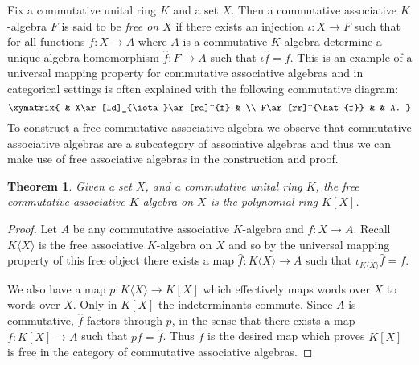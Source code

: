\documentclass[12pt]{article}
\newtheorem{thm}{Theorem}
\begin{document}
Fix a commutative unital ring $K$ and a set $X$. Then a commutative associative $K$-algebra $F$ is said to be \emph{free on $X$} if there exists an injection $\iota:X\rightarrow F$ such that for all functions $f:X\rightarrow A$ where $A$ is a commutative $K$-algebra determine a unique algebra homomorphism $\hat{f}:F\rightarrow A$ such that $\iota\hat{f}=f$. This is an example of a universal mapping property for commutative associative algebras and in categorical settings is often explained with the following commutative diagram:
\[\xymatrix{
& X\ar[ld]_{\iota}\ar[rd]^{f} & \\
F\ar[rr]^{\hat{f}} & & A.
}\]
To construct a free commutative associative algebra we observe that commutative
associative algebras are a subcategory of associative algebras and thus we
can make use of free associative algebras in the construction and proof.

\begin{thm}
Given a set $X$, and a commutative unital ring $K$, the free commutative associative $K$-algebra on $X$ is the polynomial ring $K[X]$.
\end{thm}
\begin{proof}
Let $A$ be any commutative associative $K$-algebra and $f:X\rightarrow A$.
Recall $K\langle X\rangle$ is the free associative $K$-algebra on $X$ and
so by the universal mapping property of this free object there exists a 
map $\hat{f}:K\langle X\rangle \rightarrow A$ such that $\iota_{K\langle X\rangle} \hat{f}=f$.  

We also have a map $p:K\langle X\rangle\rightarrow K[X]$ which effectively
maps words over $X$ to words over $X$.  Only in $K[X]$ the 
indeterminants commute.  Since $A$ is commutative, $\hat{f}$ factors through
$p$, in the sense that there exists a map $\tilde{f}:K[X]\rightarrow A$ such
that $p\tilde{f}=\hat{f}$.  Thus $\tilde{f}$ is the desired map which proves $K[X]$ is free in the category of commutative
associative algebras.
\end{proof}

\end{document}
